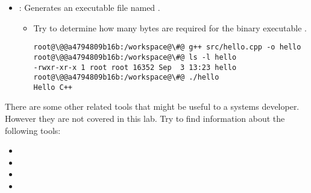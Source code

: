 \begin{itemize}
  \item {}:
        Generates an executable file named .
    \begin{itemize}
      \item Try to determine how many bytes are required for the binary
            executable .
\begin{lstlisting}[style=terminal,escapechar=@]
root@\@@a4794809b16b:/workspace@\#@ g++ src/hello.cpp -o hello
root@\@@a4794809b16b:/workspace@\#@ ls -l hello
-rwxr-xr-x 1 root root 16352 Sep  3 13:23 hello
root@\@@a4794809b16b:/workspace@\#@ ./hello
Hello C++
\end{lstlisting}
    \end{itemize}
\end{itemize}

There are some other related tools that might be useful to a systems developer.
However they are not covered in this lab.
Try to find information about the following tools:

\begin{itemize}
  \item {}
  \item {}
  \item {}
  \item {}
\end{itemize}

